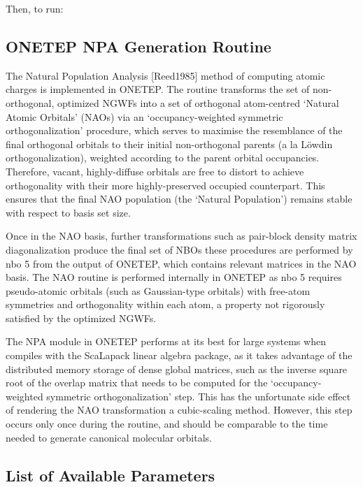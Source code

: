 \documentclass[letterpaper,10pt,english]{sphinxmanual}
\begin{document}
Then, to run:
\begin{quote}

\end{quote}


\subsection{ONETEP NPA Generation Routine}
\label{\detokenize{nbo_onetep:onetep-npa-generation-routine}}
The Natural Population Analysis {[}Reed1985{]} method of
computing atomic charges is implemented in ONETEP. The routine
transforms the set of non-orthogonal, optimized NGWFs into a set of
orthogonal atom-centred ‘Natural Atomic Orbitals’ (NAOs) via an
‘occupancy-weighted symmetric orthogonalization’ procedure, which serves
to maximise the resemblance of the final orthogonal orbitals to their
initial non-orthogonal parents (a la Löwdin orthogonalization), weighted
according to the parent orbital occupancies. Therefore, vacant,
highly-diffuse orbitals are free to distort to achieve orthogonality
with their more highly-preserved occupied counterpart. This ensures that
the final NAO population (the ‘Natural Population’) remains stable with
respect to basis set size.

Once in the NAO basis, further transformations such as pair-block
density matrix diagonalization produce the final set of NBOs \textendash{} these
procedures are performed by nbo 5 from the  output of ONETEP,
which contains relevant matrices in the NAO basis. The NAO routine is
performed internally in ONETEP as nbo 5 requires pseudo-atomic orbitals
(such as Gaussian-type orbitals) with free-atom symmetries and
orthogonality within each atom, a property not rigorously satisfied by
the optimized NGWFs.

The NPA module in ONETEP performs at its best for large systems when
compiles with the ScaLapack linear algebra package, as it takes
advantage of the distributed memory storage of dense global matrices,
such as the inverse square root of the overlap matrix that needs to be
computed for the ‘occupancy-weighted symmetric orthogonalization’ step.
This has the unfortunate side effect of rendering the NAO transformation
a cubic-scaling method. However, this step occurs only once during the
routine, and should be comparable to the time needed to generate
canonical molecular orbitals.


\subsection{List of Available Parameters}
\label{\detokenize{nbo_onetep:list-of-available-parameters}}
\end{document}
